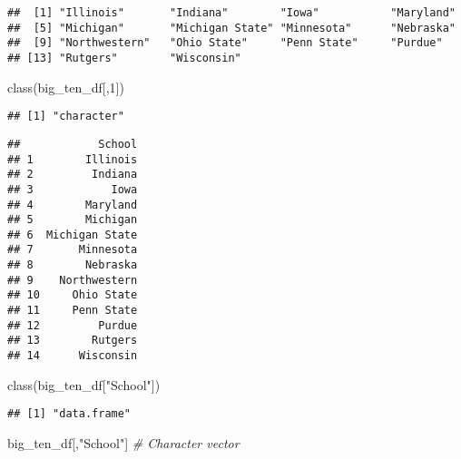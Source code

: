 \documentclass[
]{article}
\newenvironment{Shaded}{\begin{snugshade}}{\end{snugshade}}
\newcommand{\CommentTok}[1]{\textcolor[rgb]{0.56,0.35,0.01}{\textit{#1}}}
\newcommand{\DecValTok}[1]{\textcolor[rgb]{0.00,0.00,0.81}{#1}}
\newcommand{\FunctionTok}[1]{\textcolor[rgb]{0.00,0.00,0.00}{#1}}
\newcommand{\NormalTok}[1]{#1}
\newcommand{\StringTok}[1]{\textcolor[rgb]{0.31,0.60,0.02}{#1}}
\begin{document}
\begin{verbatim}
##  [1] "Illinois"       "Indiana"        "Iowa"           "Maryland"      
##  [5] "Michigan"       "Michigan State" "Minnesota"      "Nebraska"      
##  [9] "Northwestern"   "Ohio State"     "Penn State"     "Purdue"        
## [13] "Rutgers"        "Wisconsin"
\end{verbatim}

\begin{Shaded}
\begin{Highlighting}[]
\FunctionTok{class}\NormalTok{(big\_ten\_df[,}\DecValTok{1}\NormalTok{])}
\end{Highlighting}
\end{Shaded}

\begin{verbatim}
## [1] "character"
\end{verbatim}

\begin{Shaded}
\end{Shaded}

\begin{verbatim}
##            School
## 1        Illinois
## 2         Indiana
## 3            Iowa
## 4        Maryland
## 5        Michigan
## 6  Michigan State
## 7       Minnesota
## 8        Nebraska
## 9    Northwestern
## 10     Ohio State
## 11     Penn State
## 12         Purdue
## 13        Rutgers
## 14      Wisconsin
\end{verbatim}

\begin{Shaded}
\begin{Highlighting}[]
\FunctionTok{class}\NormalTok{(big\_ten\_df[}\StringTok{"School"}\NormalTok{])                        }
\end{Highlighting}
\end{Shaded}

\begin{verbatim}
## [1] "data.frame"
\end{verbatim}

\begin{Shaded}
\begin{Highlighting}[]
\NormalTok{big\_ten\_df[,}\StringTok{"School"}\NormalTok{]                       }\CommentTok{\# Character vector}
\end{Highlighting}
\end{Shaded}
\end{document}

